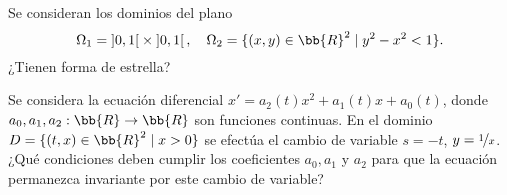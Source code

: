\documentclass[12pt]{article}
\begin{document}
    \begin{ejercicio}
        Se consideran los dominios del plano
        \begin{equation*}
            \Omega_1 = \left]0, 1\right[ \times \left]0, 1\right[, \quad \Omega_2 = \{(x, y) \in \bb{R}^2 \mid y^2 - x^2 < 1\}.
        \end{equation*}
        ¿Tienen forma de estrella?
    \end{ejercicio}

    \begin{ejercicio}
        Se considera la ecuación diferencial $x' = a_2(t)x^2 + a_1(t)x + a_0(t)$, donde $a_0, a_1, a_2 : \bb{R} \to \bb{R}$ son funciones continuas. En el dominio $D = \{(t, x) \in \bb{R}^2 \mid x > 0\}$ se efectúa el cambio de variable $s = -t$, $y = \nicefrac{1}{x}$. ¿Qué condiciones deben cumplir los coeficientes $a_0, a_1$ y $a_2$ para que la ecuación permanezca invariante por este cambio de variable?
    \end{ejercicio}
\end{document}
